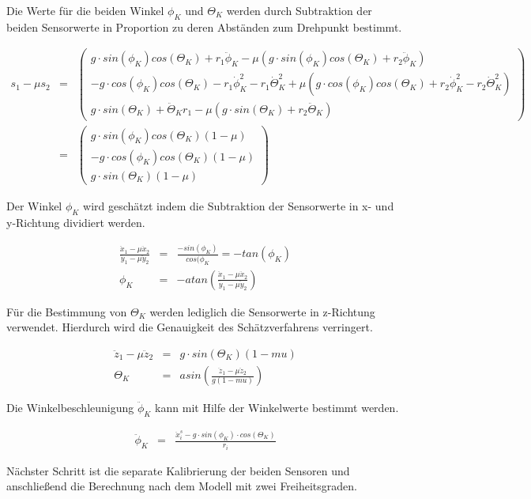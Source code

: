 \documentclass{article}
\begin{document}
Die Werte für die beiden Winkel $\phi_K$ und $\Theta_K$ werden durch Subtraktion der beiden Sensorwerte in Proportion zu deren Abständen zum Drehpunkt bestimmt.

\begin{equation}
\begin{array}{lcl}
s_1 - \mu s_2 
& = &
\begin{pmatrix}
g \cdot sin(\phi_K)cos(\Theta_K) + r_1 \ddot{\phi}_K - \mu(g \cdot sin(\phi_K)cos(\Theta_K) + r_2 \ddot{\phi}_K) \\
-g \cdot cos(\phi_K)cos(\Theta_K) - r_1 \dot{\phi}^2_K - r_1 \dot{\Theta}^2_K + \mu (g \cdot cos(\phi_K) cos(\Theta_K) + r_2 \dot{\phi}^2_K - r_2 \dot{\Theta}^2_K)\\
g \cdot sin(\Theta_K) + \ddot{\Theta}_K r_1 - \mu(g \cdot sin(\Theta_K) + r_2 \ddot{\Theta}_K)
\end{pmatrix} 
\\
& = &
\begin{pmatrix}
g \cdot sin(\phi_K)cos(\Theta_K)(1 - \mu) \\
- g \cdot cos(\phi_K)cos(\Theta_K)(1 - \mu) \\
g \cdot sin(\Theta_K)(1 - \mu)
\end{pmatrix}
\end{array}
\end{equation}

Der Winkel $\phi_K$ wird geschätzt indem die Subtraktion der Sensorwerte in x- und y-Richtung dividiert werden.

\begin{equation}
\begin{array}{lcl}
\frac{\ddot{x}_1 - \mu \ddot{x}_2}{\ddot{y}_1 - \mu \ddot{y}_2}
& = &
\frac{- sin(\phi_K)}{cos(\phi_K} = -tan(\phi_K) \\
\phi_K
& = &
-atan(\frac{\ddot{x}_1 - \mu \ddot{x}_2}{\ddot{y}_1 - \mu \ddot{y}_2})
\end{array}
\end{equation}



Für die Bestimmung von $\Theta_K$ werden lediglich die Sensorwerte in z-Richtung verwendet. Hierdurch wird die Genauigkeit des Schätzverfahrens verringert.

\begin{equation}
\begin{array}{lcl}
\ddot{z}_1 - \mu \ddot{z}_2 
& = &
g \cdot sin(\Theta_K)(1 - mu) \\
\Theta_K
& = &
asin(\frac{\ddot{z}_1 - \mu \ddot{z}_2}{g(1 - mu)})
\end{array}
\end{equation}

Die Winkelbeschleunigung $\ddot{\phi}_K$ kann mit Hilfe der Winkelwerte bestimmt werden.

\begin{equation}
\begin{array}{lcl}
\ddot{\phi}_K
& = &
\frac{\ddot{x}^s_i - g \cdot sin(\phi_K) \cdot cos(\Theta_K)}{r_i}
\end{array}
\end{equation}

Nächster Schritt ist die separate Kalibrierung der beiden Sensoren und anschließend die Berechnung nach dem Modell mit zwei Freiheitsgraden.
\end{document}
